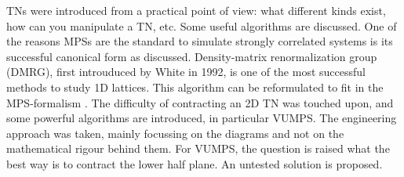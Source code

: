 \Glspl{TN} were introduced from a practical point of view: what different kinds exist, how can you manipulate a \Gls{TN}, etc. Some useful algorithms are discussed. One of the reasons \Glspl{MPS} are the standard to simulate strongly correlated systems is its successful canonical form as discussed.  Density-matrix renormalization group (DMRG), first introuduced by White in 1992, is one of the most successful methods to study 1D lattices. This algorithm can be reformulated to fit in the \Gls{MPS}-formalism \cite{Schollwock2011}. The difficulty of contracting an 2D \Gls{TN} was touched upon, and some powerful algorithms are introduced, in particular VUMPS. The engineering approach was taken, mainly focussing on the diagrams and not on the mathematical rigour behind them. For \Gls{VUMPS}, the question is raised what the best way is to contract the lower half plane. An untested solution is proposed.
